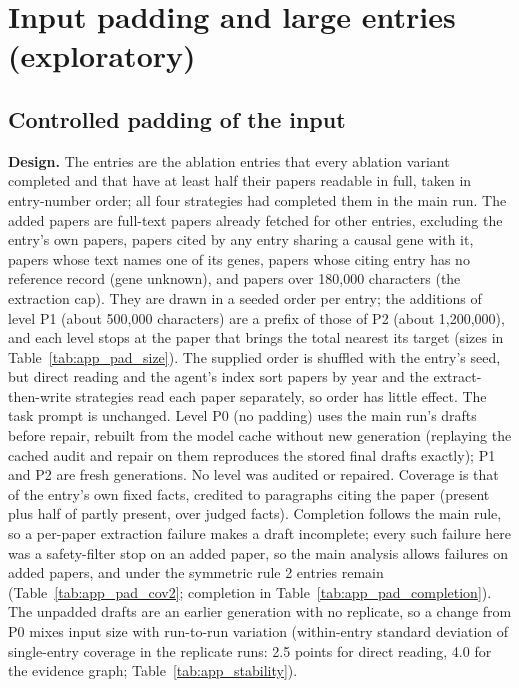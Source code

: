 \documentclass{article} %
\begin{document}
\FloatBarrier
\FloatBarrier
\section{Input padding and large entries (exploratory)}
\label{app:padding}
\subsection{Controlled padding of the input}
\textbf{Design.} The entries are the ablation entries that every ablation variant completed and that have at least half their papers readable in full, taken in entry-number order; all four strategies had completed them in the main run. The added papers are full-text papers already fetched for other entries, excluding the entry's own papers, papers cited by any entry sharing a causal gene with it, papers whose text names one of its genes, papers whose citing entry has no reference record (gene unknown), and papers over 180,000 characters (the extraction cap). They are drawn in a seeded order per entry; the additions of level P1 (about 500,000 characters) are a prefix of those of P2 (about 1,200,000), and each level stops at the paper that brings the total nearest its target (sizes in Table~\ref{tab:app_pad_size}). The supplied order is shuffled with the entry's seed, but direct reading and the agent's index sort papers by year and the extract-then-write strategies read each paper separately, so order has little effect. The task prompt is unchanged. Level P0 (no padding) uses the main run's drafts before repair, rebuilt from the model cache without new generation (replaying the cached audit and repair on them reproduces the stored final drafts exactly); P1 and P2 are fresh generations. No level was audited or repaired. Coverage is that of the entry's own fixed facts, credited to paragraphs citing the paper (present plus half of partly present, over judged facts). Completion follows the main rule, so a per-paper extraction failure makes a draft incomplete; every such failure here was a safety-filter stop on an added paper, so the main analysis allows failures on added papers, and under the symmetric rule 2 entries remain (Table~\ref{tab:app_pad_cov2}; completion in Table~\ref{tab:app_pad_completion}). The unpadded drafts are an earlier generation with no replicate, so a change from P0 mixes input size with run-to-run variation (within-entry standard deviation of single-entry coverage in the replicate runs: 2.5 points for direct reading, 4.0 for the evidence graph; Table~\ref{tab:app_stability}).
\end{document}
